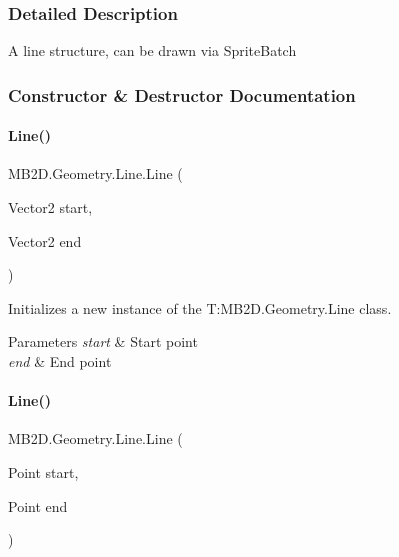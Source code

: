 \subsubsection{Detailed Description}
A line structure, can be drawn via Sprite\+Batch 



\subsubsection{Constructor \& Destructor Documentation}
\hypertarget{class_m_b2_d_1_1_geometry_1_1_line_a72a1804c7d045920d82ed26689fe10c6}{}\label{class_m_b2_d_1_1_geometry_1_1_line_a72a1804c7d045920d82ed26689fe10c6} 
\paragraph{\texorpdfstring{Line()}{Line()}\hspace{0.1cm}{\footnotesize\ttfamily [1/2]}}
{\footnotesize\ttfamily M\+B2\+D.\+Geometry.\+Line.\+Line (\begin{DoxyParamCaption}\item[{Vector2}]{start,  }\item[{Vector2}]{end }\end{DoxyParamCaption})\hspace{0.3cm}{\ttfamily [inline]}}



Initializes a new instance of the T\+:\+M\+B2\+D.\+Geometry.\+Line class. 


\begin{DoxyParams}{Parameters}
{\em start} & Start point\\
\hline
{\em end} & End point\\
\hline
\end{DoxyParams}
\hypertarget{class_m_b2_d_1_1_geometry_1_1_line_a7c3e02a1c56c94be46ce9ad55eaa87b8}{}\label{class_m_b2_d_1_1_geometry_1_1_line_a7c3e02a1c56c94be46ce9ad55eaa87b8} 
\paragraph{\texorpdfstring{Line()}{Line()}\hspace{0.1cm}{\footnotesize\ttfamily [2/2]}}
{\footnotesize\ttfamily M\+B2\+D.\+Geometry.\+Line.\+Line (\begin{DoxyParamCaption}\item[{Point}]{start,  }\item[{Point}]{end }\end{DoxyParamCaption})\hspace{0.3cm}{\ttfamily [inline]}}



